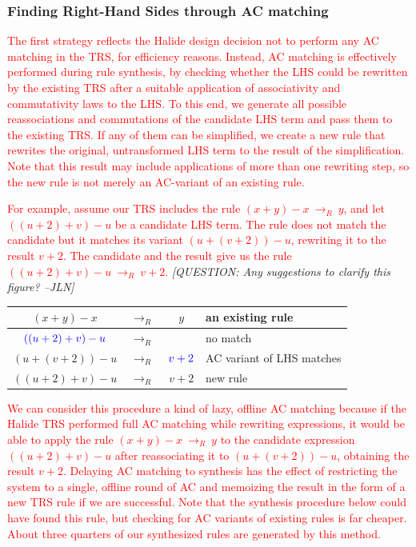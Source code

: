 \documentclass[acmsmall,review]{acmart}\settopmatter{printfolios=true,printccs=false,printacmref=false}
\newcommand{\jln}[1]{\textcolor{uwpurple}{\textit{[{#1} --JLN]}}}
\newcommand{\modified}[1]{\textcolor{red}{{#1}}}
\newcommand{\rewrites}[0]{\:\rightarrow_{R}\:}
\begin{document}
\subsubsection{Finding Right-Hand Sides through AC matching}
\label{sec:rhsacmatching}
\modified{The first strategy reflects the Halide design decision not to perform any AC matching in the TRS, for efficiency reasons. 
Instead, AC matching is effectively performed during rule synthesis, by checking whether the LHS could be 
rewritten by the existing TRS after a suitable application of associativity and commutativity laws to the LHS. 
To this end, we generate all possible reassociations and commutations of the candidate LHS term and pass them to the existing TRS. 
If any of them can be simplified, we create a new rule that rewrites 
the original, untransformed LHS term to the result of the simplification.  Note that this result may include applications of more than one rewriting step, so the new rule is not merely an AC-variant of an existing rule. }

\modified{For example, assume our TRS includes the rule $(x + y) - x \rewrites y$, 
and let $((u + 2) + v) - u$ be a candidate LHS term. The rule does not match the candidate but it matches its variant $(u + (v + 2)) - u$, rewriting it to the result $v + 2$. The candidate and the result give us the rule $((u + 2) + v) - u \rewrites v + 2$. }
\jln{QUESTION: Any suggestions to clarify this figure?}
\begin{center}
\begin{tabular}{cccl}
$(x + y) - x$ & $\rewrites$ & $y$ & an existing rule \\
\hline
$\textcolor{blue}{((u + 2) + v) - u}$ & $\rewrites$ & & no match \\
$(u + (v + 2)) - u$ & $\rewrites$ & $\textcolor{blue}{v + 2}$ & AC variant of LHS matches \\
\hline
$((u + 2) + v) - u$ & $\rewrites$ & $v + 2$ & new rule
\end{tabular}
\end{center}

\modified{We can consider this procedure a kind of lazy, offline AC matching because if the Halide TRS 
performed full AC matching while rewriting expressions, it would be able to apply the rule $(x + y) - x \rewrites  y$ to the candidate expression $((u + 2) + v) - u$ after reassociating it to $(u + (v + 2)) - u$, obtaining the result $v + 2$.  Delaying AC matching to synthesis has the effect of restricting the system to a single, offline round of AC and memoizing the result in the form of a new TRS rule if we are successful. 
Note that the synthesis procedure below could have found this rule, but checking for AC
variants of existing rules is far cheaper. About three quarters of our synthesized rules are generated by this method.}
\end{document}
